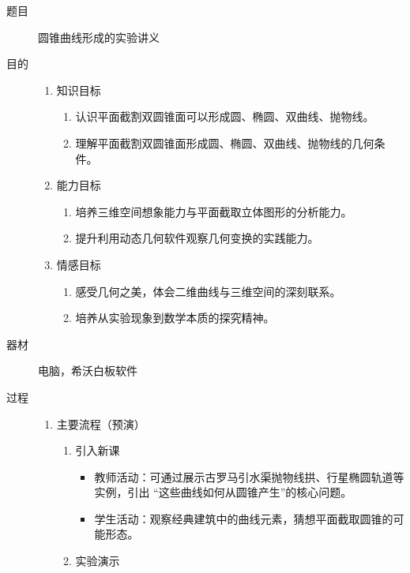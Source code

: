 \begin{description}
  \item[题目] \hspace*{2em} 圆锥曲线形成的实验讲义
  \item[目的] \mbox{} \vspace*{-1.8em}
    \begin{enumerate}
      \item 知识目标
        \begin{enumerate}
          \item 认识平面截割双圆锥面可以形成圆、椭圆、双曲线、抛物线。
          \item 理解平面截割双圆锥面形成圆、椭圆、双曲线、抛物线的几何条件。
        \end{enumerate}
      \item 能力目标
        \begin{enumerate}
          \item 培养三维空间想象能力与平面截取立体图形的分析能力。
          \item 提升利用动态几何软件观察几何变换的实践能力。
        \end{enumerate}
      \item 情感目标
        \begin{enumerate}
          \item 感受几何之美，体会二维曲线与三维空间的深刻联系。
          \item 培养从实验现象到数学本质的探究精神。
        \end{enumerate}
    \end{enumerate}
  \item[器材] \hspace*{2em} 电脑，希沃白板软件
  \item[过程] \mbox{} \vspace{-1.8em}
    \begin{enumerate}[label=(\zhnum*)]
      \item 主要流程（预演）
        \begin{enumerate}[1.]
          \item 引入新课
          \begin{itemize}
              \item 教师活动：可通过展示古罗马引水渠抛物线拱、行星椭圆轨道等实例，引出 “这些曲线如何从圆锥产生”的核心问题。
              \item 学生活动：观察经典建筑中的曲线元素，猜想平面截取圆锥的可能形态。
          \end{itemize}
          \item 实验演示

\end{enumerate}
\end{enumerate}
\end{description}
